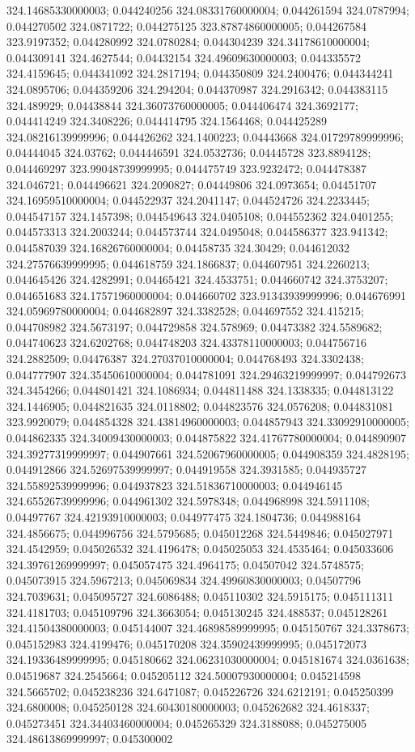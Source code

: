 324.14685330000003; 0.044240256 324.08331760000004; 0.044261594 324.0787994; 0.044270502 324.0871722; 0.044275125 323.87874860000005; 0.044267584 323.9197352; 0.044280992 324.0780284; 0.044304239 324.34178610000004; 0.044309141 324.4627544; 0.04432154 324.49609630000003; 0.044335572 324.4159645; 0.044341092 324.2817194; 0.044350809 324.2400476; 0.044344241 324.0895706; 0.044359206 324.294204; 0.044370987 324.2916342; 0.044383115 324.489929; 0.04438844 324.36073760000005; 0.044406474 324.3692177; 0.044414249 324.3408226; 0.044414795 324.1564468; 0.044425289 324.08216139999996; 0.044426262 324.1400223; 0.04443668 324.01729789999996; 0.04444045 324.03762; 0.044446591 324.0532736; 0.04445728 323.8894128; 0.044469297 323.99048739999995; 0.044475749 323.9232472; 0.044478387 324.046721; 0.044496621 324.2090827; 0.04449806 324.0973654; 0.04451707 324.16959510000004; 0.044522937 324.2041147; 0.044524726 324.2233445; 0.044547157 324.1457398; 0.044549643 324.0405108; 0.044552362 324.0401255; 0.044573313 324.2003244; 0.044573744 324.0495048; 0.044586377 323.941342; 0.044587039 324.16826760000004; 0.04458735 324.30429; 0.044612032 324.27576639999995; 0.044618759 324.1866837; 0.044607951 324.2260213; 0.044645426 324.4282991; 0.04465421 324.4533751; 0.044660742 324.3753207; 0.044651683 324.17571960000004; 0.044660702 323.91343939999996; 0.044676991 324.05969780000004; 0.044682897 324.3382528; 0.044697552 324.415215; 0.044708982 324.5673197; 0.044729858 324.578969; 0.04473382 324.5589682; 0.044740623 324.6202768; 0.044748203 324.43378110000003; 0.044756716 324.2882509; 0.04476387 324.27037010000004; 0.044768493 324.3302438; 0.044777907 324.35450610000004; 0.044781091 324.29463219999997; 0.044792673 324.3454266; 0.044801421 324.1086934; 0.044811488 324.1338335; 0.044813122 324.1446905; 0.044821635 324.0118802; 0.044823576 324.0576208; 0.044831081 323.9920079; 0.044854328 324.43814960000003; 0.044857943 324.33092910000005; 0.044862335 324.34009430000003; 0.044875822 324.41767780000004; 0.044890907 324.39277319999997; 0.044907661 324.52067960000005; 0.044908359 324.4828195; 0.044912866 324.52697539999997; 0.044919558 324.3931585; 0.044935727 324.55892539999996; 0.044937823 324.51836710000003; 0.044946145 324.65526739999996; 0.044961302 324.5978348; 0.044968998 324.5911108; 0.04497767 324.42193910000003; 0.044977475 324.1804736; 0.044988164 324.4856675; 0.044996756 324.5795685; 0.045012268 324.5449846; 0.045027971 324.4542959; 0.045026532 324.4196478; 0.045025053 324.4535464; 0.045033606 324.39761269999997; 0.045057475 324.4964175; 0.04507042 324.5748575; 0.045073915 324.5967213; 0.045069834 324.49960830000003; 0.04507796 324.7039631; 0.045095727 324.6086488; 0.045110302 324.5915175; 0.045111311 324.4181703; 0.045109796 324.3663054; 0.045130245 324.488537; 0.045128261 324.41504380000003; 0.045144007 324.46898589999995; 0.045150767 324.3378673; 0.045152983 324.4199476; 0.045170208 324.35902439999995; 0.045172073 324.19336489999995; 0.045180662 324.06231030000004; 0.045181674 324.0361638; 0.04519687 324.2545664; 0.045205112 324.50007930000004; 0.045214598 324.5665702; 0.045238236 324.6471087; 0.045226726 324.6212191; 0.045250399 324.6800008; 0.045250128 324.60430180000003; 0.045262682 324.4618337; 0.045273451 324.34403460000004; 0.045265329 324.3188088; 0.045275005 324.48613869999997; 0.045300002 